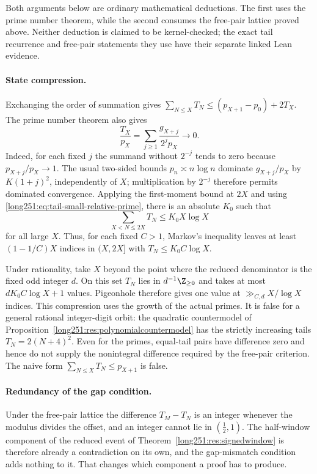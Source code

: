 Both arguments below are ordinary mathematical deductions.  The first uses
the prime number theorem, while the second consumes the free-pair lattice
proved above.  Neither deduction is claimed to be kernel-checked; the exact
tail recurrence and free-pair statements they use have their separate linked
Lean evidence.

\paragraph{State compression.}  Exchanging the order of summation gives
$\sum_{N\le X}T_N\le(p_{X+1}-p_0)+2T_X$.  The prime number theorem
\cite[Ch.~6]{mv2007} also gives
\begin{equation}\label{long251:eq:tail-small-relative-prime}
 \frac{T_X}{p_X}
 =\sum_{j\ge1}\frac{g_{X+j}}{2^jp_X}\longrightarrow0.
\end{equation}
Indeed, for each fixed $j$ the summand without $2^{-j}$ tends to zero because
$p_{X+j}/p_X\to1$.  The usual two-sided bounds $p_n\asymp n\log n$ dominate
$g_{X+j}/p_X$ by $K(1+j)^2$, independently of $X$; multiplication by $2^{-j}$
therefore permits dominated convergence.  Applying the first-moment bound at
$2X$ and using \eqref{long251:eq:tail-small-relative-prime}, there is an absolute
$K_0$ such that
\[
 \sum_{X<N\le2X}T_N\le K_0X\log X
\]
for all large $X$.  Thus, for each fixed $C>1$, Markov's inequality leaves at
least $(1-1/C)X$ indices in $(X,2X]$ with $T_N\le K_0C\log X$.

Under rationality, take $X$ beyond the point where the reduced denominator is
the fixed odd integer $d$.  On this set $T_N$ lies in $d^{-1}\Z_{\ge0}$ and
takes at most $dK_0C\log X+1$ values.  Pigeonhole therefore gives one value at
$\gg_{C,d}X/\log X$ indices.  This compression uses the growth of the actual
primes.  It is false for a general rational integer-digit orbit: the quadratic
countermodel of Proposition~\ref{long251:res:polynomialcountermodel} has the
strictly increasing tails $T_N=2(N+4)^2$.  Even for the primes, equal-tail
pairs have difference zero and hence do not supply the nonintegral difference
required by the free-pair criterion.  The naive form
$\sum_{N\le X}T_N\le p_{X+1}$ is false.

\paragraph{Redundancy of the gap condition.}  Under the free-pair lattice the
difference $T_M-T_N$ is an integer whenever the modulus divides the offset, and
an integer cannot lie in $(\tfrac12,1)$.  The half-window component of the
reduced event of Theorem~\ref{long251:res:signedwindow} is therefore already a
contradiction on its own, and the gap-mismatch condition adds nothing to it.
That changes which component a proof has to produce.

